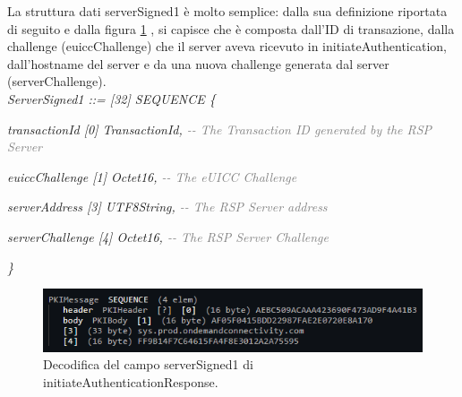 \documentclass[10pt, oneside]{book}
\begin{document}
La struttura dati serverSigned1 è molto semplice: dalla sua definizione riportata di seguito e dalla figura \ref{fig:decode-serverSigned1} \cite{RSP-definitions}, si capisce che è composta dall'ID di transazione, dalla challenge (euiccChallenge) che il server aveva ricevuto in initiateAuthentication, dall'hostname del server e da una nuova challenge generata dal server (serverChallenge).\\

\textit{ServerSigned1 ::= [32] SEQUENCE \{}

\hspace{0.75cm} \textit{transactionId [0] TransactionId, \textcolor{gray}{{-}{-} The Transaction ID generated by the RSP Server}}

\hspace{0.75cm} \textit{euiccChallenge [1] Octet16, \textcolor{gray}{{-}{-} The eUICC Challenge}}

\hspace{0.75cm} \textit{serverAddress [3] UTF8String, \textcolor{gray}{{-}{-} The RSP Server address}}

\hspace{0.75cm} \textit{serverChallenge [4] Octet16, \textcolor{gray}{{-}{-} The RSP Server Challenge}}

\textit{\}\\}

\begin{figure}
\includegraphics[width=\linewidth]{decode-serverSigned1.png}
\caption{Decodifica del campo serverSigned1 di initiateAuthenticationResponse.}
\label{fig:decode-serverSigned1}
\end{figure}
\end{document}
